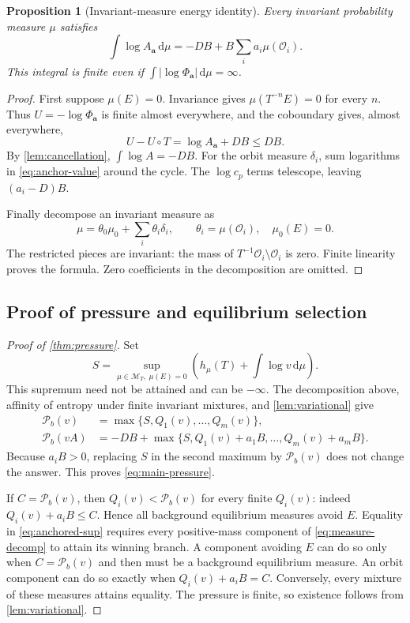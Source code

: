 \documentclass[11pt,a4paper]{article}
\numberwithin{equation}{section}
\newtheorem{proposition}[proposition]{Proposition}\aliascntresetthe{proposition}
\theoremstyle{definition}
\theoremstyle{remark}
\newcommand{\dd}{\,\mathrm d}
\newcommand{\cM}{\mathcal M}
\newcommand{\cO}{\mathcal O}
\newcommand{\PP}{\mathcal P}
\begin{document}
\begin{proposition}[Invariant-measure energy identity]
\label{prop:energy}
Every invariant probability measure $\mu$ satisfies
\begin{equation}
 \boxed{\quad
 \int\log A_{\boldsymbol a}\dd\mu
 =-DB+B\sum_i a_i\mu(\cO_i).
 \quad}
 \label{eq:energy}
\end{equation}
This integral is finite even if
$\int|\log\Phi_{\boldsymbol a}|\dd\mu=\infty$.
\end{proposition}
\begin{proof}
First suppose $\mu(E)=0$. Invariance gives $\mu(T^{-n}E)=0$ for every
$n$. Thus $U=-\log\Phi_{\boldsymbol a}$ is finite almost everywhere,
and the coboundary gives, almost everywhere,
\[
 U-U\circ T=\log A_{\boldsymbol a}+DB\le DB.
\]
By \cref{lem:cancellation}, $\int\log A=-DB$.
For the orbit measure $\delta_i$, sum logarithms in
\cref{eq:anchor-value} around the cycle. The $\log c_p$ terms telescope,
leaving $(a_i-D)B$.

Finally decompose an invariant measure as
\begin{equation}
 \mu=\theta_0\mu_0+\sum_i\theta_i\delta_i,
 \qquad \theta_i=\mu(\cO_i),\quad\mu_0(E)=0.
 \label{eq:measure-decomp}
\end{equation}
The restricted pieces are invariant: the mass of
$T^{-1}\cO_i\setminus\cO_i$ is zero. Finite linearity proves the
formula. Zero coefficients in the decomposition are omitted.
\end{proof}

\subsection{Proof of pressure and equilibrium selection}
\begin{proof}[Proof of \cref{thm:pressure}]
Set
\[
 S=\sup_{\mu\in\cM_T,\ \mu(E)=0}
       \left(h_\mu(T)+\int\log v\dd\mu\right).
\]
This supremum need not be attained and can be $-\infty$.
The decomposition above, affinity of entropy under finite invariant
mixtures, and \cref{lem:variational} give
\begin{align}
 \PP_b(v)&=\max\{S,Q_1(v),\ldots,Q_m(v)\},\label{eq:base-sup}\\
 \PP_b(vA)&=-DB+\max\{S,Q_1(v)+a_1B,\ldots,Q_m(v)+a_mB\}.
 \label{eq:anchored-sup}
\end{align}
Because $a_iB>0$, replacing $S$ in the second maximum by $\PP_b(v)$
does not change the answer. This proves \cref{eq:main-pressure}.

If $C=\PP_b(v)$, then $Q_i(v)<\PP_b(v)$ for every finite $Q_i(v)$:
indeed $Q_i(v)+a_iB\le C$. Hence all background equilibrium measures
avoid $E$. Equality in \cref{eq:anchored-sup} requires every positive-mass
component of \cref{eq:measure-decomp} to attain its winning branch.
A component avoiding $E$ can do so only when $C=\PP_b(v)$ and then
must be a background equilibrium measure. An orbit component can do so
exactly when $Q_i(v)+a_iB=C$. Conversely, every mixture of these
measures attains equality. The pressure is finite, so existence follows
from \cref{lem:variational}.
\end{proof}
\end{document}

